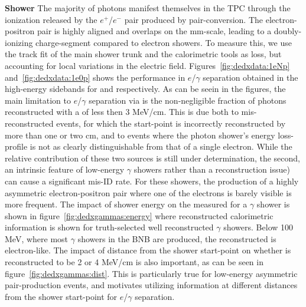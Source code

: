 \par \textbf{Shower \dedx} The majority of photons manifest themselves in the TPC through the ionization released by the $e^+$/$e^-$ pair produced by pair-conversion. The electron-positron pair is highly aligned and overlaps on the mm-scale, leading to a doubly-ionizing charge-segment compared to electron showers. To measure this, we use the track fit of the main shower trunk and the calorimetric tools as loss, but accounting for local variations in the electric field. Figures~\ref{fig:dedxdata:1eNp} and~\ref{fig:dedxdata:1e0p} shows the performance in $e$/$\gamma$ separation obtained in the high-energy sidebands for \npsel and \zpsel respectively. As can be seein in the figures, the main limitation to $e$/$\gamma$ separation via \dedx is the non-negligible fraction of photons reconstructed with a \dedx of less then 3 MeV/cm. This is due both to mis-reconstructed events, for which the start-point is incorrectly reconstructed by more than one or two cm, and to events where the photon shower's energy loss-profile is not as clearly distinguishable from that of a single electron. While the relative contribution of these two sources is still under determination, the second, an intrinsic feature of low-energy $\gamma$ showers rather than a reconstruction issue) can cause a significant mis-ID rate. For these showers, the production of a highly asymmetric electron-positron pair where one of the electrons is barely visible is more frequent. The impact of shower energy on the measured \dedx for a $\gamma$ shower is shown in figure~\ref{fig:dedxgammas:energy} where reconstructed calorimetric information is shown for truth-selected well reconstructed $\gamma$ showers. Below 100 MeV, where most $\gamma$ showers in the BNB are produced, the reconstructed \dedx is electron-like. The impact of distance from the shower start-point on whether \dedx is reconstructed to be 2 or 4 MeV/cm is also important, as can be seen in figure~\ref{fig:dedxgammas:dist}. This is particularly true for low-energy asymmetric pair-production events, and motivates utilizing \dedx information at different distances from the shower start-point for $e$/$\gamma$ separation. 



